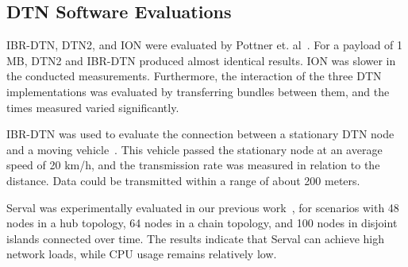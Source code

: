 \subsection{DTN Software Evaluations}

IBR-DTN, DTN2, and ION were evaluated by Pottner et. al~\cite{pottner2011performance}. For a payload of 1 MB, DTN2 and IBR-DTN produced almost identical results. ION was slower in the conducted measurements. Furthermore, the interaction of the three DTN implementations was evaluated by transferring bundles between them, and the times measured varied significantly.

IBR-DTN was used to evaluate the connection between a stationary DTN node and a moving vehicle~\cite{doering2008ibr}. This vehicle passed the stationary node at an average speed of 20 km/h, and the transmission rate was measured in relation to the distance. Data could be transmitted within a range of about 200 meters.

Serval was experimentally evaluated in our previous work~\cite{baumgaertner2016experimental}, for scenarios with 48 nodes in a hub topology, 64 nodes in a chain topology, and 100 nodes in disjoint islands connected over time. The results indicate that Serval can achieve high network loads, while CPU usage remains relatively low.
